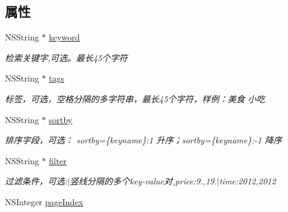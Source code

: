 \subsection*{属性}
\begin{DoxyCompactItemize}
\item 
\hypertarget{interface_b_m_k_cloud_search_info_a90f2d3ef36a31112ca8fdb6d70fabea6}{}N\+S\+String $\ast$ \hyperlink{interface_b_m_k_cloud_search_info_a90f2d3ef36a31112ca8fdb6d70fabea6}{keyword}\label{interface_b_m_k_cloud_search_info_a90f2d3ef36a31112ca8fdb6d70fabea6}

\begin{DoxyCompactList}\small\item\em 检索关键字,可选。最长45个字符 \end{DoxyCompactList}\item 
\hypertarget{interface_b_m_k_cloud_search_info_ae2c16f1281195d1fbf738ac23552d8f7}{}N\+S\+String $\ast$ \hyperlink{interface_b_m_k_cloud_search_info_ae2c16f1281195d1fbf738ac23552d8f7}{tags}\label{interface_b_m_k_cloud_search_info_ae2c16f1281195d1fbf738ac23552d8f7}

\begin{DoxyCompactList}\small\item\em 标签，可选，空格分隔的多字符串，最长45个字符，样例：美食 小吃 \end{DoxyCompactList}\item 
N\+S\+String $\ast$ \hyperlink{interface_b_m_k_cloud_search_info_ab0d42d1b9e841c5e538e457e819a07f7}{sortby}
\begin{DoxyCompactList}\small\item\em 排序字段，可选： sortby=\{keyname\}\+:1 升序；sortby=\{keyname\}\+:-\/1 降序 \end{DoxyCompactList}\item 
N\+S\+String $\ast$ \hyperlink{interface_b_m_k_cloud_search_info_a65d91501d19f2a6aa027de6f9e5bc837}{filter}
\begin{DoxyCompactList}\small\item\em 过滤条件，可选\+:\textquotesingle{}$\vert$\textquotesingle{}竖线分隔的多个key-\/value对,price\+:9.,19.$\vert$time\+:2012,2012 \end{DoxyCompactList}\item 
\hypertarget{interface_b_m_k_cloud_search_info_aeea99c3907cafe38def8105839ad4c8a}{}N\+S\+Integer \hyperlink{interface_b_m_k_cloud_search_info_aeea99c3907cafe38def8105839ad4c8a}{page\+Index}\label{interface_b_m_k_cloud_search_info_aeea99c3907cafe38def8105839ad4c8a}


\end{DoxyCompactItemize}
